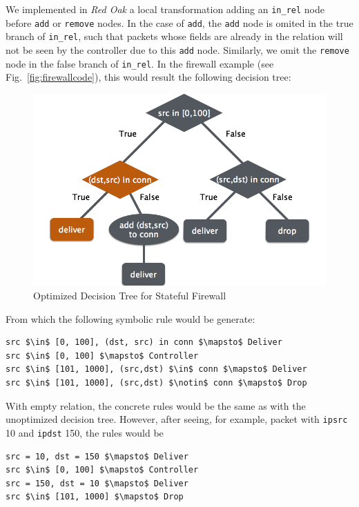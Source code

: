 \documentclass[preprint]{sigplanconf}
\begin{document}
We implemented in \textit{Red Oak} a local transformation adding an \lstinline|in_rel| node before \lstinline|add| or \lstinline|remove| nodes. In the case of \lstinline|add|, the \lstinline|add| node is omited in the true branch of \lstinline|in_rel|, such that packets whose fields are already in the relation will not be seen by the controller due to this \lstinline|add| node. Similarly, we omit the \lstinline|remove| node in the false branch of \lstinline|in_rel|. In the firewall example (see Fig.~\ref{fig:firewallcode}), this would result the following decision tree:

\begin{figure}[ht]
  \includegraphics[scale=.33]{img/optdtree.png}
\caption{Optimized Decision Tree for Stateful Firewall}     
\label{fig:decisiontreeopt}  
  \end{figure}


From which the following symbolic rule would be generate:
\begin{lstlisting}[mathescape]
src $\in$ [0, 100], (dst, src) in conn $\mapsto$ Deliver
src $\in$ [0, 100] $\mapsto$ Controller
src $\in$ [101, 1000], (src,dst) $\in$ conn $\mapsto$ Deliver
src $\in$ [101, 1000], (src,dst) $\notin$ conn $\mapsto$ Drop
\end{lstlisting}

With empty relation, the concrete rules would be the same as with the unoptimized decision tree. However, after seeing, for example, packet with \lstinline|ipsrc| 10 and \lstinline|ipdst| 150, the rules would be
\begin{lstlisting}[mathescape]
src = 10, dst = 150 $\mapsto$ Deliver  
src $\in$ [0, 100] $\mapsto$ Controller  
src = 150, dst = 10 $\mapsto$ Deliver  
src $\in$ [101, 1000] $\mapsto$ Drop  
\end{lstlisting}
\end{document}

